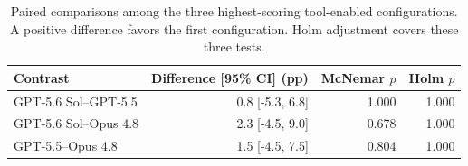 \begin{table}[t]
\centering
\small
\setlength{\tabcolsep}{3.5pt}
\caption{Paired comparisons among the three highest-scoring tool-enabled configurations. A positive difference favors the first configuration. Holm adjustment covers these three tests.}
\label{tab:top-group-paired}
\begin{tabular}{lrrr}
\toprule
Contrast & Difference [95\% CI] (pp) & McNemar $p$ & Holm $p$ \\
\midrule
GPT-5.6 Sol--GPT-5.5 & 0.8 [-5.3, 6.8] & 1.000 & 1.000 \\
GPT-5.6 Sol--Opus 4.8 & 2.3 [-4.5, 9.0] & 0.678 & 1.000 \\
GPT-5.5--Opus 4.8 & 1.5 [-4.5, 7.5] & 0.804 & 1.000 \\
\bottomrule
\end{tabular}
\end{table}
